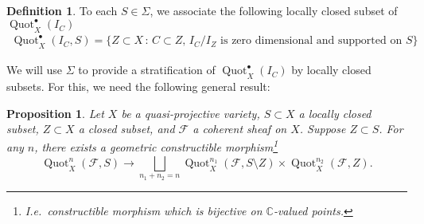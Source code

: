 \documentclass[12pt]{amsart}
\newtheorem{proposition}[theorem]{Proposition}
\theoremstyle{definition}
\newtheorem{definition}[theorem]{Definition}
\newcommand{\CC} {\mathbb{C}}          %
\newcommand{\Quot}{\operatorname{Quot}}
\newcommand{\F}{\mathcal{F}}
\begin{document}
\begin{definition}
To each $S \in \Sigma$, we associate the following locally closed 
subset of $\Quot_X^{\bullet}(I_C)$ 
\begin{align*}
\Quot_X^{\bullet}(I_C,S) = \{Z\subset X \, : \, C\subset Z\text{, $I_{C}/I_{Z}$ 
is zero dimensional and supported on $S$} \}
\end{align*}
\end{definition}

We will use $\Sigma$ to provide a stratification of $\Quot_X^{\bullet}(I_{C})$ 
by locally closed subsets. For this, we need the following general result:
\begin{proposition}
Let $X$ be a quasi-projective variety, $S \subset X$ a locally closed subset, 
$Z \subset X$ a closed subset, and $\F$ a coherent sheaf on $X$. Suppose 
$Z \subset S$. For any $n$, there exists a geometric constructible 
morphism\footnote{I.e.~constructible morphism which is bijective 
on $\CC$-valued points.}
\[
\Quot_X^n(\F,S) \longrightarrow \bigsqcup_{n_1+n_2=n} 
\Quot^{n_1}_X(\F,S \setminus Z) \times \Quot^{n_2}_X(\F,Z).
\]
\end{proposition}
\end{document}
